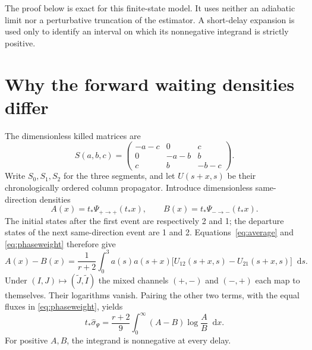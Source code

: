 \documentclass[11pt,a4paper]{article}
\newcommand{\dd}{\mathop{}\!\mathrm{d}}
\newcommand{\ts}{t_*}
\newcommand{\sigw}{\widehat{\sigma}_{\Psi}}
\begin{document}
The proof below is exact for this finite-state model. It uses neither an adiabatic limit nor a perturbative truncation of the estimator. A short-delay expansion is used only to identify an interval on which its nonnegative integrand is strictly positive.

\section{Why the forward waiting densities differ}
The dimensionless killed matrices are
\begin{equation}
 S(a,b,c)=
 \begin{pmatrix}
 -a-c&0&c\\
 0&-a-b&b\\
 c&b&-b-c
 \end{pmatrix}.
 \label{eq:S}
\end{equation}
Write $S_0,S_1,S_2$ for the three segments, and let $U(s+x,s)$ be their chronologically ordered column propagator. Introduce dimensionless same-direction densities
\begin{equation}
 A(x)=\ts\Psi_{+\to+}(\ts x),\qquad
 B(x)=\ts\Psi_{-\to-}(\ts x).
 \label{eq:AB}
\end{equation}
The initial states after the first event are respectively 2 and 1; the departure states of the next same-direction event are 1 and 2. Equations~\eqref{eq:average} and \eqref{eq:phaseweight} therefore give
\begin{equation}
 A(x)-B(x)=\frac1{r+2}\int_0^3 a(s)a(s+x)
 \bigl[U_{12}(s+x,s)-U_{21}(s+x,s)\bigr]\dd s.
 \label{eq:ABint}
\end{equation}
Under $(I,J)\mapsto(\widetilde J,\widetilde I)$ the mixed channels $(+,-)$ and $(-,+)$ each map to themselves. Their logarithms vanish. Pairing the other two terms, with the equal fluxes in \eqref{eq:phaseweight}, yields
\begin{equation}
 \ts\sigw=\frac{r+2}{9}\int_0^\infty
 (A-B)\log\frac AB\dd x.
 \label{eq:paired}
\end{equation}
For positive $A,B$, the integrand is nonnegative at every delay.
\end{document}

